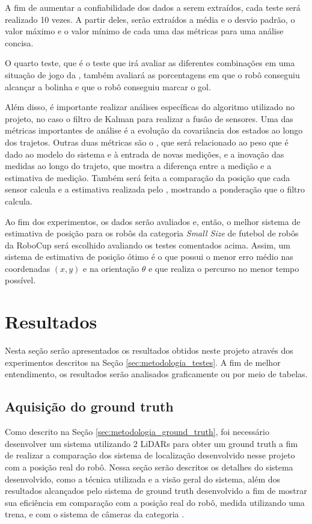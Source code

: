 \documentclass[acronym, symbols, table]{fei}
\begin{document}
		A fim de aumentar a confiabilidade dos dados a serem extraídos, cada teste será realizado 10 vezes. A partir deles, serão extraídos a média e o desvio padrão, o valor máximo e o valor mínimo de cada uma das métricas para uma análise concisa.
		
		O quarto teste, que é o teste que irá avaliar as diferentes combinações em uma situação de jogo da , também avaliará as porcentagens em que o robô conseguiu alcançar a bolinha e que o robô conseguiu marcar o gol.
		
		Além disso, é importante realizar análises específicas do algoritmo utilizado no projeto, no caso o filtro de Kalman para realizar a fusão de sensores. Uma das métricas importantes de análise é a evolução da covariância dos estados ao longo dos trajetos. Outras duas métricas são o , que será relacionado ao peso que é dado ao modelo do sistema e à entrada de novas medições, e a inovação das medidas ao longo do trajeto, que mostra a diferença entre a medição e a estimativa de medição. Também será feita a comparação da posição que cada sensor calcula e a estimativa realizada pelo , mostrando a ponderação que o filtro calcula.
		
		Ao fim dos experimentos, os dados serão avaliados e, então, o melhor sistema de estimativa de posição para os robôs da categoria \textit{Small Size} de futebol de robôs da RoboCup será escolhido avaliando os testes comentados acima. Assim, um sistema de estimativa de posição ótimo é o que possui o menor erro médio nas coordenadas $(x, y)$ e na orientação $\theta$ e que realiza o percurso no menor tempo possível.
		
	\chapter{Resultados}
	
		Nesta seção serão apresentados os resultados obtidos neste projeto através dos experimentos descritos na Seção \ref{sec:metodologia_testes}. A fim de melhor entendimento, os resultados serão analisados graficamente ou por meio de tabelas.
		
		\section{Aquisição do ground truth} \label{sec:resultados_ground_truth}
		
			Como descrito na Seção \ref{sec:metodologia_ground_truth}, foi necessário desenvolver um sistema utilizando 2 LiDARs para obter um ground truth a fim de realizar a comparação dos sistema de localização desenvolvido nesse projeto com a posição real do robô. Nessa seção serão descritos os detalhes do sistema desenvolvido, como a técnica utilizada e a visão geral do sistema, além dos resultados alcançados pelo sistema de ground truth desenvolvido a fim de mostrar sua eficiência em comparação com a posição real do robô, medida utilizando uma trena, e com o sistema de câmeras da categoria .
		
\end{document}
